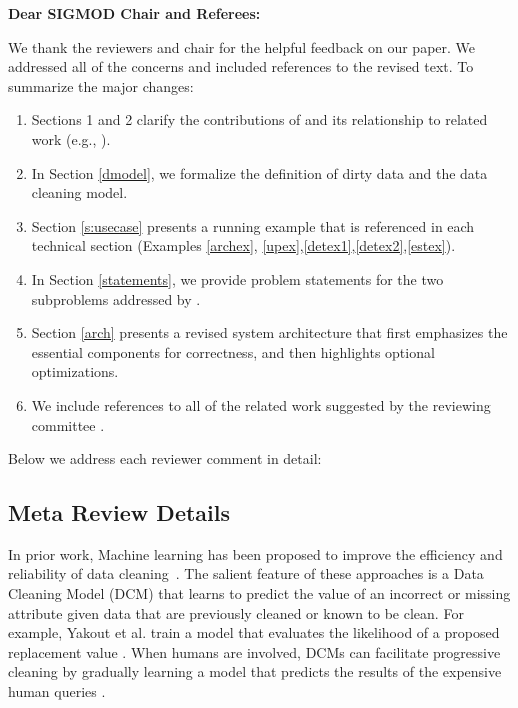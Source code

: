 {\noindent \normalsize \bf Dear SIGMOD Chair and Referees: }

\vspace{.5em}

We thank the reviewers and chair for the helpful feedback on our paper. 
We addressed all of the concerns and included references to the revised text. 
To summarize the major changes:

\begin{enumerate}
\item Sections 1 and 2 clarify the contributions of \sys and its relationship to related work (e.g., \cite{gokhale2014corleone, DBLP:journals/pvldb/YakoutENOI11, yakout2013don}).

\item In Section \ref{dmodel}, we formalize the definition of dirty data and the data cleaning model.

\item Section \ref{s:usecase} presents a running example that is referenced in each technical section (Examples \ref{archex}, \ref{upex},\ref{detex1},\ref{detex2},\ref{estex}).

\item In Section \ref{statements}, we provide problem statements for the two subproblems addressed by \sys.

\item Section \ref{arch} presents a revised system architecture that first emphasizes the essential components for correctness, and then highlights optional optimizations. 

\item We include references to all of the related work suggested by the reviewing committee \cite{whang2014incremental, papenbrock2015progressive, gruenheid2014incremental, DBLP:journals/pvldb/YakoutENOI11, yakout2013don, heise2014estimating}.

\end{enumerate}
Below we address each reviewer comment in detail:

\vspace{0.5em}

\subsection*{Meta Review Details} 
In prior work, Machine learning has been proposed to improve the efficiency and reliability of data cleaning~\cite{yakout2013don,gokhale2014corleone}.
The salient feature of these approaches is a Data Cleaning Model (DCM) that learns to predict the value of an incorrect or missing attribute given data that are previously cleaned or known to be clean.
For example, Yakout et al. train a model that evaluates the likelihood of a proposed replacement value \cite{yakout2013don}.
When humans are involved, DCMs can facilitate progressive cleaning by gradually learning a model that predicts the results of the expensive human queries \cite{gokhale2014corleone, DBLP:journals/pvldb/MozafariSFJM14, DBLP:journals/pvldb/YakoutENOI11}.

